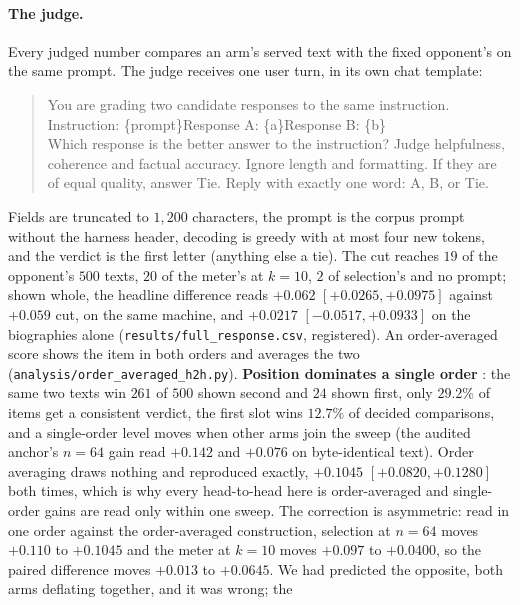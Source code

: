 \paragraph{The judge.}\label{app:judgemethod}
Every judged number compares an arm's served text with the fixed opponent's on the same prompt. The judge
receives one user turn, in its own chat template:
\begin{quote}\footnotesize\ttfamily\raggedright
You are grading two candidate responses to the same instruction.\\
Instruction: \{prompt\}\quad Response A: \{a\}\quad Response B: \{b\}\\
Which response is the better answer to the instruction? Judge helpfulness, coherence and factual
accuracy. Ignore length and formatting. If they are of equal quality, answer Tie. Reply with
exactly one word: A, B, or Tie.
\end{quote}
Fields are truncated to $1{,}200$ characters, the prompt is the corpus prompt without the harness header,
decoding is greedy with at most four new tokens, and the verdict is the first letter (anything else a
tie). The cut reaches $19$ of the opponent's $500$ texts, $20$ of the meter's at $k=10$, $2$ of selection's and
no prompt; shown whole, the headline difference reads $+0.062$ $[+0.0265, +0.0975]$ against $+0.059$ cut, on
the same machine, and $+0.0217$ $[-0.0517, +0.0933]$ on the biographies alone
(\texttt{results/\allowbreak full\_\allowbreak response.csv}, registered). An order-averaged score shows the item in both orders and averages the two
(\texttt{analysis/\allowbreak order\_\allowbreak averaged\_\allowbreak h2h.py}). \textbf{Position dominates a
single order} \citep{zheng2023judging}: the same two texts win $261$ of $500$ shown second and $24$ shown
first, only $29.2\%$ of items get a consistent verdict, the first slot wins $12.7\%$ of decided
comparisons, and a single-order level moves when other arms join
the sweep (the audited anchor's $n=64$ gain read $+0.142$ and $+0.076$ on byte-identical text). Order
averaging draws nothing and reproduced exactly, $+0.1045$ $[+0.0820, +0.1280]$ both times, which is why every
head-to-head here is order-averaged and single-order gains are read only within one sweep. The correction
is asymmetric: read in one order against the order-averaged construction, selection at $n=64$ moves
$+0.110$ to $+0.1045$ and the meter at $k=10$ moves $+0.097$ to $+0.0400$, so the paired difference moves
$+0.013$ to $+0.0645$. We had predicted the opposite, both arms deflating together, and it was wrong; the
